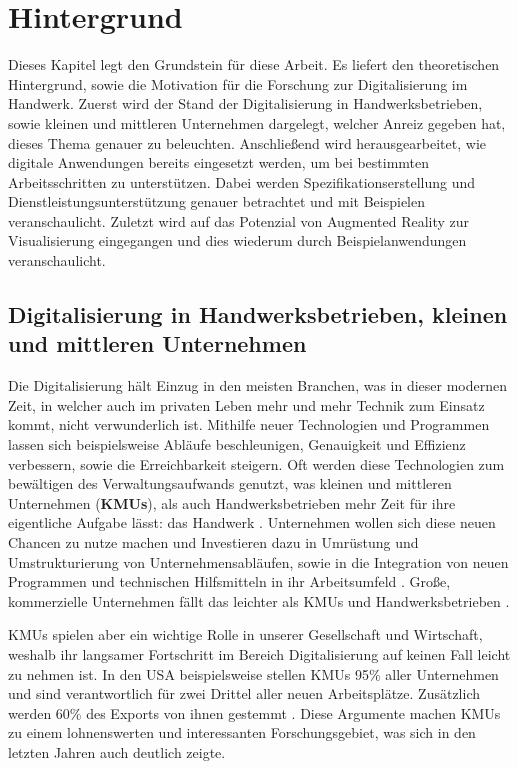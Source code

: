\chapter{Hintergrund}

Dieses Kapitel legt den Grundstein für diese Arbeit. Es liefert den theoretischen Hintergrund, sowie die Motivation für die Forschung zur Digitalisierung im Handwerk. Zuerst wird der Stand der Digitalisierung in Handwerksbetrieben, sowie kleinen und mittleren Unternehmen dargelegt, welcher Anreiz gegeben hat, dieses Thema genauer zu beleuchten. Anschließend wird herausgearbeitet, wie digitale Anwendungen bereits eingesetzt werden, um bei bestimmten Arbeitsschritten zu unterstützen. Dabei werden Spezifikationserstellung und Dienstleistungsunterstützung genauer betrachtet und mit Beispielen veranschaulicht. Zuletzt wird auf das Potenzial von Augmented Reality zur Visualisierung eingegangen und dies wiederum durch Beispielanwendungen veranschaulicht.

\section{Digitalisierung in Handwerksbetrieben, kleinen und mittleren Unternehmen}

Die Digitalisierung hält Einzug in den meisten Branchen, was in dieser modernen Zeit, in welcher auch im privaten Leben mehr und mehr Technik zum Einsatz kommt, nicht verwunderlich ist. Mithilfe neuer Technologien und Programmen lassen sich beispielsweise Abläufe beschleunigen, Genauigkeit und Effizienz verbessern, sowie die Erreichbarkeit steigern. Oft werden diese Technologien zum bewältigen des Verwaltungsaufwands genutzt, was kleinen und mittleren Unternehmen (\textbf{KMUs}), als auch Handwerksbetrieben mehr Zeit für ihre eigentliche Aufgabe lässt: das Handwerk \cite{noauthor_neue_nodate}. Unternehmen wollen sich diese neuen Chancen zu nutze machen und Investieren dazu in Umrüstung und Umstrukturierung von Unternehmensabläufen, sowie in die Integration von neuen Programmen und technischen Hilfsmitteln in ihr Arbeitsumfeld \cite{TODO: Buchkapitel}. Große, kommerzielle Unternehmen fällt das leichter als KMUs und Handwerksbetrieben \cite{hateful_six_krcmar}.

KMUs spielen aber ein wichtige Rolle in unserer Gesellschaft und Wirtschaft, weshalb ihr langsamer Fortschritt im Bereich Digitalisierung auf keinen Fall leicht zu nehmen ist. In den USA beispielsweise stellen KMUs 95\% aller Unternehmen und sind verantwortlich für zwei Drittel aller neuen Arbeitsplätze. Zusätzlich werden 60\% des Exports von ihnen gestemmt \cite{allocca_innovation_2006}. Diese Argumente machen KMUs zu einem lohnenswerten und interessanten Forschungsgebiet, was sich in den letzten Jahren auch deutlich zeigte.

